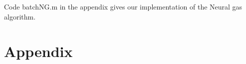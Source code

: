 \documentclass[10pt]{article}
\begin{document}
\subsection{}
Code batchNG.m in the appendix gives our implementation of the Neural gas algorithm.

\subsection{}

\subsection{}


\section*{Appendix}
{\label{kmeans}}
{\label{runKMeans}}
\end{document}
